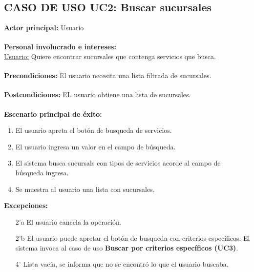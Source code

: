 \documentclass[11pt]{article}
\begin{document}
\subsection*{\textbf{CASO DE USO UC2:} Buscar sucursales }
\textbf{Actor principal:} Usuario\\
\\
\textbf{Personal involucrado e intereses: }\\\underline{Usuario:} Quiere encontrar sucursales que contenga servicios que busca.\\
\\
\textbf{Precondiciones:} El usuario necesita una lista filtrada de sucursales.\\
\\
\textbf{Postcondiciones:} EL usuario obtiene una lista de sucursales.\\
\\
\textbf{Escenario principal de éxito:}
\begin{enumerate}
\item El usuario apreta el botón de busqueda de servicios.
\item El usuario ingresa un valor en el campo de búsqueda.
\item El sistema busca sucursals con tipos de servicios acorde al campo de búsqueda ingresa.
\item Se muestra al usuario una lista con sucursales.
\end{enumerate}
\textbf{Excepciones:}
\begin{enumerate}
\item[2'a] El usuario cancela la operación.
\item[2'b] El usuario puede apretar el botón de busqueda con criterios específicos. El sistema invoca al caso de uso \textbf{Buscar por criterios específicos (UC3)}.
\item[4'] Lista vacía, se informa que no se encontró lo que el usuario buscaba.
\end{enumerate}
\end{document}
